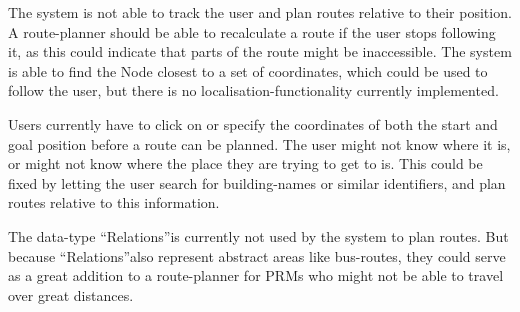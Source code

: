 The system is not able to track the user and plan routes relative to their position. A route-planner should be able to recalculate a route if the user stops following it, as this could indicate that parts of the route might be inaccessible. The system is able to find the Node closest to a set of coordinates, which could be used to follow the user, but there is no localisation-functionality currently implemented.

Users currently have to click on or specify the coordinates of both the start and goal position before a route can be planned. The user might not know where it is, or might not know where the place they are trying to get to is. This could be fixed by letting the user search for building-names or similar identifiers, and plan routes relative to this information.

The data-type \textquotedblleft Relations\textquotedblright is currently not used by the system to plan routes. But because \textquotedblleft Relations\textquotedblright also represent abstract areas like bus-routes, they could serve as a great addition to a route-planner for PRMs who might not be able to travel over great distances.